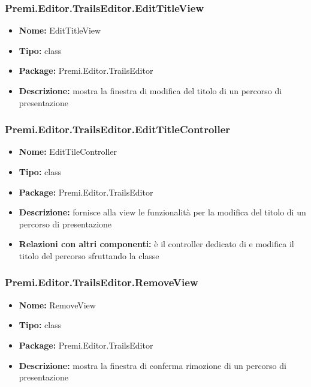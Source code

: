 \subsubsection{Premi.Editor.TrailsEditor.EditTitleView}
\begin{itemize}
  \item \textbf{Nome:} EditTitleView
  \item \textbf{Tipo:} class
  \item \textbf{Package:} Premi.Editor.TrailsEditor
  \item \textbf{Descrizione:} mostra la finestra di modifica del titolo di un percorso di presentazione
\end{itemize}
\subsubsection{Premi.Editor.TrailsEditor.EditTitleController}
\begin{itemize}
  \item \textbf{Nome:} EditTileController
  \item \textbf{Tipo:} class
  \item \textbf{Package:} Premi.Editor.TrailsEditor
  \item \textbf{Descrizione:} fornisce alla view le funzionalità per la modifica del titolo di un percorso di presentazione
  \item \textbf{Relazioni con altri componenti:} è il controller dedicato di   e modifica il titolo del percorso sfruttando la classe 
\end{itemize}
\subsubsection{Premi.Editor.TrailsEditor.RemoveView}
\begin{itemize}
  \item \textbf{Nome:} RemoveView
  \item \textbf{Tipo:} class
  \item \textbf{Package:} Premi.Editor.TrailsEditor
  \item \textbf{Descrizione:} mostra la finestra di conferma rimozione di un percorso di presentazione
\end{itemize}
